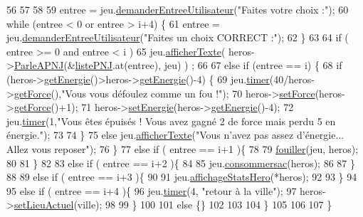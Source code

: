 \begin{DoxyCode}
56 
57 
58 
59         entree = jeu.\hyperlink{class_jeu_ac504a2a26ad7aa3c4281f8ab40cdc445}{demanderEntreeUtilisateur}(\textcolor{stringliteral}{"Faites votre choix :"});
60         \textcolor{keywordflow}{while} (entree < 0 or entree > i+4) \{
61             entree = jeu.\hyperlink{class_jeu_ac504a2a26ad7aa3c4281f8ab40cdc445}{demanderEntreeUtilisateur}(\textcolor{stringliteral}{"Faites un choix CORRECT :"});
62         \}
63 
64         \textcolor{keywordflow}{if} ( entree >= 0 and entree < i )
65             jeu.\hyperlink{class_jeu_aa09fb40439f16b9665a0d76679f78e4e}{afficherTexte}( heros->\hyperlink{class_heros_a4052af6e407ebdf4918e62340d374829}{ParleAPNJ}(&\hyperlink{class_lieu_a8c1e20b105f7972f22d8f16651de4ebd}{listePNJ}.at(entree), jeu) ) 
      ;
66 
67         \textcolor{keywordflow}{else} \textcolor{keywordflow}{if} (entree == i) \{
68             \textcolor{keywordflow}{if} (heros->\hyperlink{class_heros_ae9bbef6d2edcb8b14d9ec3854146a42c}{getEnergie}()>heros->\hyperlink{class_heros_ae9bbef6d2edcb8b14d9ec3854146a42c}{getEnergie}()-4) \{
69             jeu.\hyperlink{class_jeu_a52ce4fb6c415b45209db13a589c9d675}{timer}(40/heros->\hyperlink{class_personnage_a40de0ba95f25eb6f1653b6a4183763ae}{getForce}(),\textcolor{stringliteral}{"Vous vous défoulez comme un fou !"});
70             heros->\hyperlink{class_personnage_a6745d147720906f2c85ddce11981d71f}{setForce}(heros->\hyperlink{class_personnage_a40de0ba95f25eb6f1653b6a4183763ae}{getForce}()+1);
71             heros->\hyperlink{class_heros_a5d4f5d3d3a4db451923f0609a3e1b53c}{setEnergie}(heros->\hyperlink{class_heros_ae9bbef6d2edcb8b14d9ec3854146a42c}{getEnergie}()-4);
72             jeu.\hyperlink{class_jeu_a52ce4fb6c415b45209db13a589c9d675}{timer}(1,\textcolor{stringliteral}{"Vous êtes épuisés ! Vous avez gagné 2 de force mais perdu 5 en énergie."});
73 
74             \}
75             \textcolor{keywordflow}{else} jeu.\hyperlink{class_jeu_aa09fb40439f16b9665a0d76679f78e4e}{afficherTexte}(\textcolor{stringliteral}{"Vous n'avez pas assez d'énergie... Allez vous reposer"});
76         \}
77         \textcolor{keywordflow}{else} \textcolor{keywordflow}{if} ( entree == i+1 )\{
78 
79             \hyperlink{class_lieu_a90d7fd86c93e59830e20156ddb7aeb50}{fouiller}(jeu, heros);
80 
81         \}
82 
83         \textcolor{keywordflow}{else} \textcolor{keywordflow}{if} ( entree == i+2 )\{
84 
85             jeu.\hyperlink{class_jeu_a26c7a428a96b1f987150cb708fa7d903}{consommersac}(heros);
86 
87         \}
88 
89         \textcolor{keywordflow}{else} \textcolor{keywordflow}{if} ( entree == i+3 )\{
90 
91             jeu.\hyperlink{class_jeu_a7f9e3b8e6f3ad5d2c47ae29c54f2bdc4}{affichageStatsHero}(*heros);
92 
93         \}
94 
95         \textcolor{keywordflow}{else} \textcolor{keywordflow}{if} ( entree == i+4 )\{
96             jeu.\hyperlink{class_jeu_a52ce4fb6c415b45209db13a589c9d675}{timer}(4, \textcolor{stringliteral}{"retour à la ville"});
97             heros->\hyperlink{class_heros_a8decc0b04f6724de10d2e2a8d1c3395c}{setLieuActuel}(ville);
98 
99         \}
100 
101         \textcolor{keywordflow}{else} \{\}
102 
103 
104     \}
105 
106 
107     \}
\end{DoxyCode}


